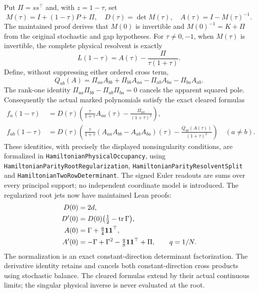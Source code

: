 Put \(\Pi=ss^\top\) and, with \(z=1-\tau\), set
\[
 M(\tau)=I+(1-\tau)P+\Pi,\quad
 D(\tau)=\det M(\tau),\quad A(\tau)=I-M(\tau)^{-1}.
\]
The maintained proof derives that \(M(0)\) is invertible and
\(M(0)^{-1}=K+\Pi\) from the original stochastic and gap hypotheses.
For \(\tau\ne0,-1\), when \(M(\tau)\) is invertible, the complete
physical resolvent is exactly
\[
 L(1-\tau)=A(\tau)-\frac{\Pi}{\tau(1+\tau)} .
\]
Define, without suppressing either ordered cross term,
\[
 Q_{ab}(A)=\Pi_{aa}A_{bb}+\Pi_{bb}A_{aa}
                       -\Pi_{ab}A_{ba}-\Pi_{ba}A_{ab}.
\]
The rank-one identity
\(\Pi_{aa}\Pi_{bb}-\Pi_{ab}\Pi_{ba}=0\)
cancels the apparent squared pole. Consequently the actual marked
polynomials satisfy the exact cleared formulas
\[
 \begin{split}
 f_a(1-\tau)
   &=D(\tau)\left(\frac{\tau}{1+\tau}A_{aa}(\tau)
                         -\frac{\Pi_{aa}}{(1+\tau)^2}\right),\\
 f_{ab}(1-\tau)
   &=D(\tau)\left(\frac{\tau}{1+\tau}
         (A_{aa}A_{bb}-A_{ab}A_{ba})(\tau)
                         -\frac{Q_{ab}(A(\tau))}{(1+\tau)^2}\right)
                         \quad(a\ne b).
 \end{split}
\]
These identities, with precisely the displayed nonsingularity
conditions, are formalized in \texttt{HamiltonianPhysicalOccupancy},
using \texttt{HamiltonianParityRootRegularization},
\texttt{HamiltonianParityResolventSplit} and
\texttt{HamiltonianTwoRowDeterminant}.
The signed Euler readouts are sums over every principal support;
no independent coordinate model is introduced.
The regularized root jets now have maintained Lean proofs:
\[
 \begin{split}
 D(0)&=2d,\\
 D'(0)&=D(0)\bigl(\tfrac12-\operatorname{tr}\Gamma\bigr),\\
 A(0)&=\Gamma+\tfrac q4\mathbf1\mathbf1^\top,\\
 A'(0)&=-\Gamma+\Gamma^2-\tfrac q8\mathbf1\mathbf1^\top+\Pi,
       \qquad q=1/N.
 \end{split}
\]
The normalization is an exact constant-direction determinant
factorization. The derivative identity retains and cancels both
constant-direction cross products using stochastic balance.
The cleared formulas extend by their actual continuous limits;
the singular physical inverse is never evaluated at the root.

